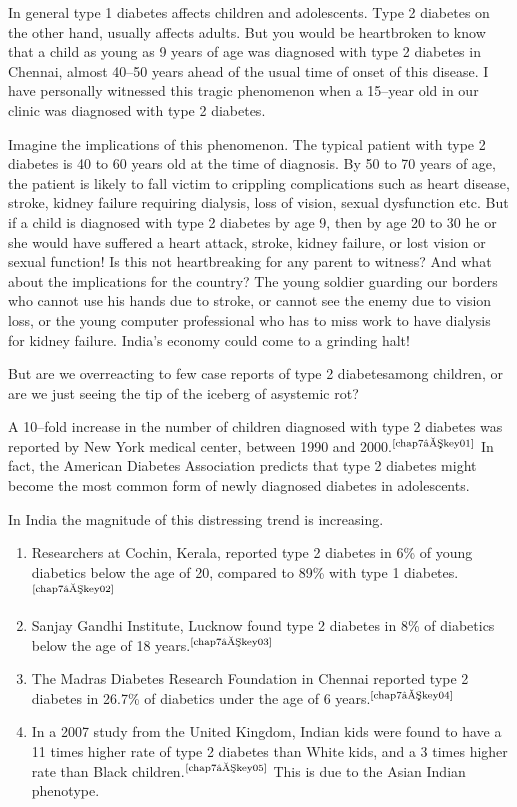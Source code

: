 In general type 1 diabetes affects children and adolescents. Type 2 diabetes on the other hand, usually affects adults. But you would be heartbroken to know that a child as young as 9 years of age was diagnosed with type 2 diabetes in Chennai, almost 40–50 years ahead of the usual time of onset of this disease. I have personally witnessed this tragic phenomenon when a 15–year old in our clinic was diagnosed with type 2 diabetes.


Imagine the implications of this phenomenon. The typical patient with type 2 diabetes is 40 to 60 years old at the time of diagnosis. By 50 to 70 years of age, the patient is likely to fall victim to crippling compli\-cations such as heart disease, stroke, kidney failure requiring dialysis, loss of vision, sexual dysfunction etc. But if a child is dia\-gnosed with type 2 diabetes by age 9, then by age 20 to 30 he or she would have suffered a heart attack, stroke, kidney failure, or lost vision or sexual function! Is this not heartbreaking for any parent to witness? And what about the implications for the country? The young soldier gua\-rding our borders who cannot use his hands due to stroke, or cannot see the enemy due to vision loss, or the young computer professional who has to miss work to have dialysis for kidney failure. India’s eco\-nomy could come to a grinding halt!


But are we overreacting to few case reports of type 2 diabetes\break among children, or are we just seeing the tip of the iceberg of a\break systemic rot?

\setlength{\parskip}{.5em}
A 10–fold increase in the number of children diagnosed with type 2 diabetes was reported by New York medical center, between 1990 and 2000.$^{\text{\cite{chap7–key01}}}$ In fact, the American Diabetes Association predicts that type 2 diabetes might become the most common form of newly diagnosed diabetes in adolescents.


\noindent In India the magnitude of this distressing trend is increasing.


\begin{enumerate}[•]
\itemsep=0pt
\item Researchers at Cochin, Kerala, reported type 2 diabetes in 6\% of young diabetics below the age of 20, compared to 89\% with type 1 diabetes.$^{\text{\cite{chap7–key02}}}$
\item Sanjay Gandhi Institute, Lucknow found type 2 diabetes in 8\% of dia\-betics below the age of 18 years.$^{\text{\cite{chap7–key03}}}$
\item The Madras Diabetes Research Foundation in Chennai reported type 2 diabetes in 26.7\% of diabetics under the age of 6 years.$^{\text{\cite{chap7–key04}}}$
\item In a 2007 study from the United Kingdom, Indian kids were found to have a 11 times higher rate of type 2 diabetes than White kids, and a 3 times higher rate than Black children.$^{\text{\cite{chap7–key05}}}$ This is due to the Asian Indian phenotype.
 \end{enumerate}


